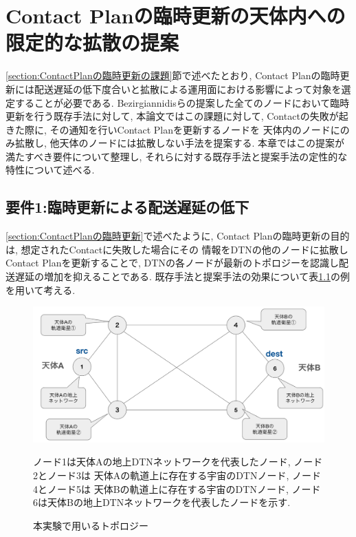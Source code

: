 \chapter{Contact Planの臨時更新の天体内への限定的な拡散の提案}
\label{chap:suggestion}
\ref{section:ContactPlanの臨時更新の課題}節で述べたとおり, 
Contact Planの臨時更新には配送遅延の低下度合いと拡散による運用面における影響によって対象を選定することが必要である. 
Bezirgiannidisらの提案した全てのノードにおいて臨時更新を行う既存手法に対して, 
本論文ではこの課題に対して, Contactの失敗が起きた際に, 
その通知を行いContact Planを更新するノードを
天体内のノードにのみ拡散し, 他天体のノードには拡散しない手法を提案する. 
本章ではこの提案が満たすべき要件について整理し, 
それらに対する既存手法と提案手法の定性的な特性について述べる. 

\section{要件1:臨時更新による配送遅延の低下}
\label{section:要件1}
\ref{section:ContactPlanの臨時更新}で述べたように, 
Contact Planの臨時更新の目的は, 想定されたContactに失敗した場合にその
情報をDTNの他のノードに拡散しContact Planを更新することで,
DTNの各ノードが最新のトポロジーを認識し配送遅延の増加を抑えることである. 
既存手法と提案手法の効果について表\ref{fig:experimentation_topology}の例を用いて考える.

\begin{figure}[tbh]
    \centering
    \includegraphics[width=0.7\textheight]{img/thesis_Sample_topology.pdf}
    \caption{本実験で用いるトポロジー}
    \label{fig:experimentation_topology}
    \begin{minipage}{\textwidth}
        \raggedright
        \vspace{3mm}
        \fontsize{10pt}{12pt}\selectfont
        ノード1は天体Aの地上DTNネットワークを代表したノード, ノード2とノード3は
        天体Aの軌道上に存在する宇宙のDTNノード, ノード4とノード5は
        天体Bの軌道上に存在する宇宙のDTNノード, 
        ノード6は天体Bの地上DTNネットワークを代表したノードを示す. 
    \end{minipage}
\end{figure}

